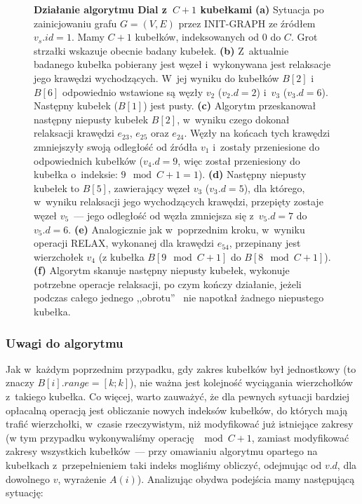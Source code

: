 \begin{figure}[!htbp]
\begin{subfigure}[b]{0.3\textwidth}
		\caption{}
	\end{subfigure}
	\caption{\textbf{Działanie algorytmu Dial z~$C+1$ kubełkami} \textbf{(a)} Sytuacja po zainicjowaniu grafu $G = \left( V, E \right)$ przez \textsf{INIT-GRAPH} ze źródłem $v_{s}.id = 1$. Mamy $C+1$ kubełków, indeksowanych od $0$ do $C$. Grot strzałki wskazuje obecnie badany kubełek. \textbf{(b)} Z~aktualnie badanego kubełka pobierany jest węzeł i~wykonywana jest relaksacje jego krawędzi wychodzących. W~jej wyniku do kubełków $B \left[ 2 \right]$ i~$B \left[ 6 \right]$ odpowiednio wstawione są węzły $v_{2}$ ($v_{2}.d = 2$) i~$v_{3}$ ($v_{3}.d = 6$). Następny kubełek ($B \left[ 1\right]$) jest pusty. \textbf{(c)} Algorytm przeskanował następny niepusty kubełek $B \left[ 2 \right]$, w~wyniku czego dokonał relaksacji krawędzi $e_{23}$, $e_{25}$ oraz $e_{24}$. Węzły na końcach tych krawędzi zmniejszyły swoją odległość od źródła $v_{1}$ i~zostały przeniesione do odpowiednich kubełków ($v_{4}.d = 9$, więc został przeniesiony do kubełka o~indeksie: $9 \mod{C+1} = 1$). \textbf{(d)} Następny niepusty kubełek to $B \left[ 5 \right]$, zawierający węzeł $v_{3}$ ($v_{3}.d = 5$), dla którego, w~wyniku relaksacji jego wychodzących krawędzi, przepięty zostaje węzeł $v_{5}$~--- jego odległość od węzła zmniejsza się z~$v_{5}.d = 7$ do $v_{5}.d = 6$. \textbf{(e)} Analogicznie jak w~poprzednim kroku, w~wyniku operacji \textsc{RELAX}, wykonanej dla krawędzi $e_{54}$, przepinany jest wierzchołek $v_{4}$ (z kubełka $B \left[ 9 \mod{C+1} \right]$ do $B \left[ 8 \mod{C+1} \right]$). \textbf{(f)} Algorytm skanuje następny niepusty kubełek, wykonuje potrzebne operacje relaksacji, po czym kończy działanie, jeżeli podczas całego jednego ,,obrotu''~ nie napotkał żadnego niepustego kubełka. } \label{fig:exampleDial}
\end{figure}

\subsubsection{Uwagi do algorytmu}

Jak w~każdym poprzednim przypadku, gdy zakres kubełków był jednostkowy (to znaczy $B \left[ i \right].range = \left[ k ; k \right]$), nie ważna jest kolejność wyciągania wierzchołków z~takiego kubełka. Co więcej, warto zauważyć, że dla pewnych sytuacji bardziej opłacalną operacją jest obliczanie nowych indeksów kubełków, do których mają trafić wierzchołki, w~czasie rzeczywistym, niż modyfikować już istniejące zakresy (w tym przypadku wykonywaliśmy operację $\mod{C+1}$, zamiast modyfikować zakresy wszystkich kubełków~--- przy omawianiu algorytmu opartego na kubełkach z~przepełnieniem taki indeks mogliśmy obliczyć, odejmując od $v.d$, dla dowolnego $v$, wyrażenie $A \left( i \right)$). Analizując obydwa podejścia mamy następującą sytuację:

